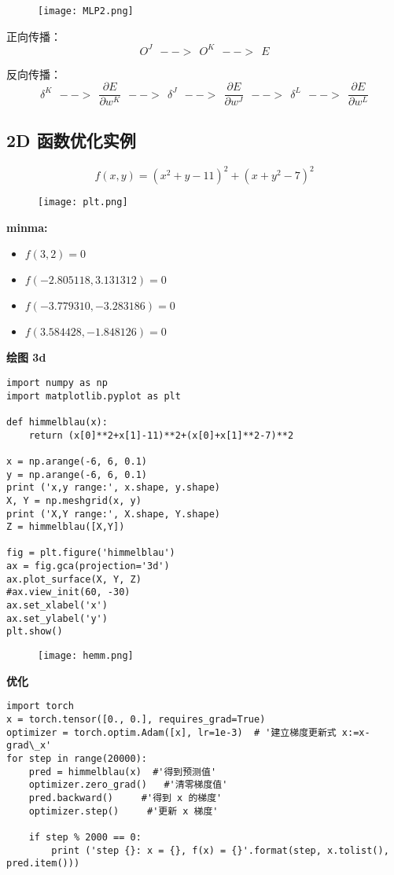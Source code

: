\begin{figure}[!h]
  \centering
  \texttt{[image: MLP2.png]}
\end{figure}

正向传播：$$O^J~~-->~~O^K~~-->~~E$$

反向传播：$$\delta^K~~-->~~\frac{\partial E}{\partial w^K}~~-->~~\delta^J~~-->~~\frac{\partial E}{\partial w^J}~~-->~~\delta^L~~-->~~\frac{\partial E}{\partial w^L}$$

\newpage
\subsection{2D 函数优化实例}
$$f(x,y)=(x^2 + y - 11)^2+(x+y^2-7)^2$$
\begin{figure}[!h]
  \centering
  \texttt{[image: plt.png]}
\end{figure}

\textbf{minma:}
\begin{itemize}
  \item $f(3, 2)=0$
  \item $f(-2.805118, 3.131312)=0$
  \item $f(-3.779310, -3.283186)=0$
  \item $f(3.584428, -1.848126)=0$
\end{itemize}

\textbf{绘图 3d}
\begin{lstlisting}
import numpy as np
import matplotlib.pyplot as plt

def himmelblau(x):
    return (x[0]**2+x[1]-11)**2+(x[0]+x[1]**2-7)**2

x = np.arange(-6, 6, 0.1)
y = np.arange(-6, 6, 0.1)
print ('x,y range:', x.shape, y.shape)
X, Y = np.meshgrid(x, y)
print ('X,Y range:', X.shape, Y.shape)
Z = himmelblau([X,Y])

fig = plt.figure('himmelblau')
ax = fig.gca(projection='3d')
ax.plot_surface(X, Y, Z)
#ax.view_init(60, -30)
ax.set_xlabel('x')
ax.set_ylabel('y')
plt.show()
\end{lstlisting}
\begin{figure}[!h]
  \centering
  \texttt{[image: hemm.png]}
\end{figure}

\textbf{优化}
\begin{lstlisting}
import torch
x = torch.tensor([0., 0.], requires_grad=True)
optimizer = torch.optim.Adam([x], lr=1e-3)  # '建立梯度更新式 x:=x-grad\_x'
for step in range(20000):
    pred = himmelblau(x)  #'得到预测值'
    optimizer.zero_grad()   #'清零梯度值'
    pred.backward()     #'得到 x 的梯度'
    optimizer.step()     #'更新 x 梯度'

    if step % 2000 == 0:
        print ('step {}: x = {}, f(x) = {}'.format(step, x.tolist(), pred.item()))
\end{lstlisting}







